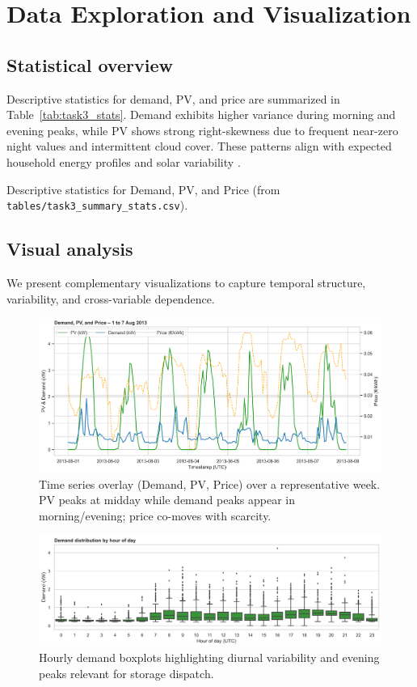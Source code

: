 \documentclass[12pt,a4paper]{article}
\begin{document}
\section{Data Exploration and Visualization}
\subsection{Statistical overview}
Descriptive statistics for demand, PV, and price are summarized in Table~\ref{tab:task3_stats}. Demand exhibits higher variance during morning and evening peaks, while PV shows strong right-skewness due to frequent near-zero night values and intermittent cloud cover. These patterns align with expected household energy profiles and solar variability \cite{Hyndman2021,Antonanzas2016}.

\begin{table}[H]
  \centering
  \caption{Descriptive statistics for Demand, PV, and Price (from \texttt{tables/task3\_summary\_stats.csv}).}
  \label{tab:task3_stats}
\end{table}

\subsection{Visual analysis}
We present complementary visualizations to capture temporal structure, variability, and cross-variable dependence.

\begin{figure}[H]
  \centering
  \includegraphics[width=\linewidth]{task3_fig1_timeseries_overlay.png}
  \caption{Time series overlay (Demand, PV, Price) over a representative week. PV peaks at midday while demand peaks appear in morning/evening; price co-moves with scarcity.}
  \label{fig:task3_ts_overlay}
\end{figure}

\begin{figure}[H]
  \centering
  \includegraphics[width=0.9\linewidth]{task3_fig3_hourly_boxplot.png}
  \caption{Hourly demand boxplots highlighting diurnal variability and evening peaks relevant for storage dispatch.}
  \label{fig:task3_boxplots}
\end{figure}
\end{document}
